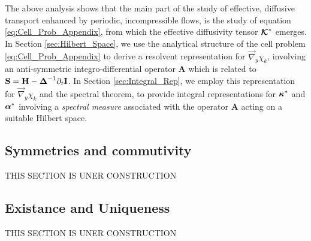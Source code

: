 \documentclass[11pt]{amsart}
\newcommand{\Hb}{\mathbf{H}}
\newcommand{\Ib}{\mathbf{I}}
\newcommand{\Sb}{\mathbf{S}}
\newcommand{\Ab}{\mathbf{A}}
\newcommand\Kbc{\mbox{\boldmath${\mathcal{K}}$}}
\newcommand\balpha{\mbox{\boldmath${\alpha}$}}
\newcommand\bDelta{\mbox{\boldmath${\Delta}$}}
\newcommand\bkappa{\mbox{\boldmath${\kappa}$}}
\begin{document}
The above analysis shows that the main part of the study of effective, 
diffusive transport enhanced by periodic, incompressible flows, is the
study of equation \eqref{eq:Cell_Prob_Appendix}, from which the
effective diffusivity tensor $\Kbc^*$ emerges. In Section
\ref{sec:Hilbert_Space}, we use the analytical structure of the cell
problem \eqref{eq:Cell_Prob_Appendix} to derive a resolvent
representation for $\vec{\nabla}_y\chi_k$, involving an anti-symmetric
integro-differential operator $\Ab$ which is related to 
$\Sb=\Hb-\bDelta^{-1}\partial_t\Ib$. In Section \ref{sec:Integral_Rep}, 
we employ this representation for $\vec{\nabla}_y\chi_k$ and the spectral
theorem, to provide integral representations for $\bkappa^*$ and
$\balpha^*$ involving a \emph{spectral measure} associated with the
operator $\Ab$ acting on a suitable Hilbert space.     
   

\subsection{Symmetries and commutivity}\label{sec:Symmetries_Commute}
%
THIS SECTION IS UNER CONSTRUCTION

%
\subsection{Existance and Uniqueness}\label{sec:Existance!}
%
THIS SECTION IS UNER CONSTRUCTION
\end{document}

